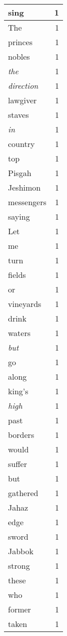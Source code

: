 \begin{center}
\begin{longtable}{l|r}
sing & 1 \\ \hline
The & 1 \\ \hline
princes & 1 \\ \hline
nobles & 1 \\ \hline
\emph{the} & 1 \\ \hline
\emph{direction} & 1 \\ \hline
lawgiver & 1 \\ \hline
staves & 1 \\ \hline
\emph{in} & 1 \\ \hline
country & 1 \\ \hline
top & 1 \\ \hline
Pisgah & 1 \\ \hline
Jeshimon & 1 \\ \hline
messengers & 1 \\ \hline
saying & 1 \\ \hline
Let & 1 \\ \hline
me & 1 \\ \hline
turn & 1 \\ \hline
fields & 1 \\ \hline
or & 1 \\ \hline
vineyards & 1 \\ \hline
drink & 1 \\ \hline
waters & 1 \\ \hline
\emph{but} & 1 \\ \hline
go & 1 \\ \hline
along & 1 \\ \hline
king's & 1 \\ \hline
\emph{high} & 1 \\ \hline
past & 1 \\ \hline
borders & 1 \\ \hline
would & 1 \\ \hline
suffer & 1 \\ \hline
but & 1 \\ \hline
gathered & 1 \\ \hline
Jahaz & 1 \\ \hline
edge & 1 \\ \hline
sword & 1 \\ \hline
Jabbok & 1 \\ \hline
strong & 1 \\ \hline
these & 1 \\ \hline
who & 1 \\ \hline
former & 1 \\ \hline
taken & 1 \\ \hline

\end{longtable}
\end{center}
